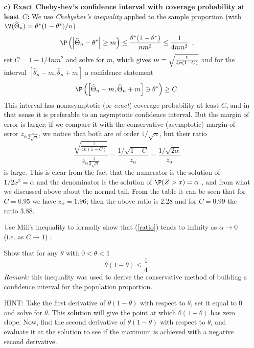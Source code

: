\textbf{c) Exact Chebyshev's confidence interval with coverage probability at least $C$: } We use \textit{Chebyshev's inequality} applied to the sample
proportion (with $\V(\widehat{\Theta}_{n})=\theta^*(1-\theta^*)/n$) 
\begin{equation*}
\P \left( \left\vert \widehat{\Theta}_{n}-\theta^*\right\vert \geq m\right) \leq \frac{%
\theta^*(1-\theta^*)}{nm^{2}}\leq \frac{1}{4nm^{2}}\enspace ,
\end{equation*}%
set $C=1-1/4nm^{2}$ and solve for $m$, which gives $m=\sqrt{\frac{1}{%
4n(1-C)}}$ and for the interval $\left[ \widehat{\theta}_{n}-m,\widehat{\theta}_{n}+m\right] $
a confidence statement 
\begin{equation*}
\P \left( \left[ \widehat{\Theta}_{n}-m,\widehat{\Theta}_{n}+m\right] \ni \theta^* \right) \geq C.
\end{equation*}%
This interval has nonasymptotic (or \textit{exact}) coverage probability at
least $C$, and in that sense it is preferable to an asymptotic confidence
interval. But the margin of error is larger: if we compare it with the
conservative (asymptotic) margin of error $z_{\alpha}\frac{1}{2%
\sqrt{n}}$, we notice that both are of order $1/\sqrt{n}$, but their ratio 
\begin{equation}
\frac{\sqrt{\frac{1}{4n(1-C)}}}{z_{\alpha}\frac{1}{2\sqrt{n}}}=%
\frac{1/\sqrt{1-C}}{z_{\alpha}}=\frac{1/\sqrt{2\alpha }}{z_{\alpha}}  \label{ratio}
\end{equation}%
is large. This is clear from the fact that the numerator is the solution of $%
1/2x^{2}=\alpha $ and the denominator is the solution of $\P (Z>x)=\alpha $%
, and from what we discussed above about the normal tail. From the table it
can be seen that for $C=0.95$ we have $z_{\alpha}=1.96$; then the
above ratio is $2.28$ and for $C=0.99$ the ratio $3.88.$\bigskip

\begin{Exercise}
Use Mill's inequality to formally show that (\ref{ratio})
tends to infinity as $\alpha \rightarrow 0$ (i.e. as $C\rightarrow 1$) .
\end{Exercise}

\begin{Exercise}[label={ExmaxOfBernoulliVarianceIsQuarter}] 
Show that for any $\theta$ with $0<\theta<1$ 
\begin{equation*}
\theta(1-\theta)\leq \frac{1}{4}.
\end{equation*}%
\textit{Remark:} this inequality was used to derive the conservative method
of building a confidence interval for the population proportion.
\end{Exercise}
\begin{Answer}
HINT: Take the first derivative of $\theta(1-\theta)$ with respect to $\theta$, set it equal to $0$ and solve for $\theta$.
This solution will give the point at which $\theta(1-\theta)$ has zero slope. 
Now, find the second derivative of $\theta(1-\theta)$ with respect to $\theta$, and evaluate it at the solution to see if the maximum is achieved with a negative second derivative.
\end{Answer}

